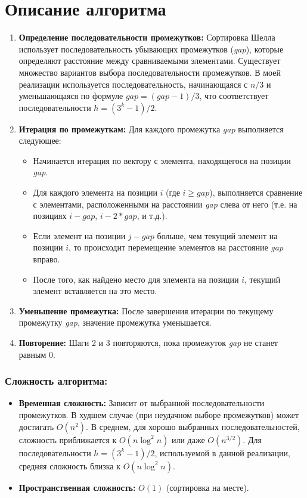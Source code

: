 \documentclass[12pt]{article}
\begin{document}
\section{Описание алгоритма}

\begin{enumerate}
    \item \textbf{Определение последовательности промежутков:} Сортировка Шелла использует последовательность убывающих промежутков (\textit{gap}), которые определяют расстояние между сравниваемыми элементами. Существует множество вариантов выбора последовательности промежутков. В моей реализации используется последовательность, начинающаяся с $n/3$ и уменьшающаяся по формуле $gap = (gap - 1) / 3$, что соответствует последовательности $h = (3^k - 1) / 2$.
    \item \textbf{Итерация по промежуткам:} Для каждого промежутка \textit{gap} выполняется следующее:
    \begin{itemize}
        \item Начинается итерация по вектору с элемента, находящегося на позиции \textit{gap}.
        \item Для каждого элемента на позиции $i$ (где $i \ge gap$), выполняется сравнение с элементами, расположенными на расстоянии \textit{gap} слева от него (т.е. на позициях $i - gap$, $i - 2*gap$, и т.д.).
        \item Если элемент на позиции $j - gap$ больше, чем текущий элемент на позиции $i$, то происходит перемещение элементов на расстояние \textit{gap} вправо.
        \item После того, как найдено место для элемента на позиции $i$, текущий элемент вставляется на это место.
    \end{itemize}
    \item \textbf{Уменьшение промежутка:} После завершения итерации по текущему промежутку \textit{gap}, значение промежутка уменьшается.
    \item \textbf{Повторение:} Шаги 2 и 3 повторяются, пока промежуток \textit{gap} не станет равным 0.
\end{enumerate}

\subsubsection*{Сложность алгоритма:}
\begin{itemize}
    \item \textbf{Временная сложность:} Зависит от выбранной последовательности промежутков. В худшем случае (при неудачном выборе промежутков) может достигать $O(n^2)$. В среднем, для хорошо выбранных последовательностей, сложность приближается к $O(n \log^2 n)$ или даже $O(n^{3/2})$. Для последовательности $h = (3^k - 1) / 2$, используемой в данной реализации, средняя сложность близка к $O(n \log^2 n)$.
    \item \textbf{Пространственная сложность:} $O(1)$ (сортировка на месте).
\end{itemize}
\end{document}
